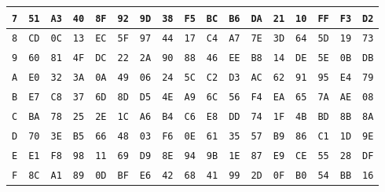 \begin{tabular}{|c|c|c|c|c|c|c|c|c|c|c|c|c|c|c|c|c|}
\cellcolor{gray!30}\texttt{7} & \texttt{51} & \texttt{A3} & \texttt{40} & \texttt{8F} & \texttt{92} & \texttt{9D} & \texttt{38} & \texttt{F5} & \texttt{BC} & \texttt{B6} & \texttt{DA} & \texttt{21} & \texttt{10} & \texttt{FF} & \texttt{F3} & \texttt{D2} \\ \hline
\cellcolor{gray!30}\texttt{8} & \texttt{CD} & \texttt{0C} & \texttt{13} & \texttt{EC} & \texttt{5F} & \texttt{97} & \texttt{44} & \texttt{17} & \texttt{C4} & \texttt{A7} & \texttt{7E} & \texttt{3D} & \texttt{64} & \texttt{5D} & \texttt{19} & \texttt{73} \\ \hline
\cellcolor{gray!30}\texttt{9} & \texttt{60} & \texttt{81} & \texttt{4F} & \texttt{DC} & \texttt{22} & \texttt{2A} & \texttt{90} & \texttt{88} & \texttt{46} & \texttt{EE} & \texttt{B8} & \texttt{14} & \texttt{DE} & \texttt{5E} & \texttt{0B} & \texttt{DB} \\ \hline
\cellcolor{gray!30}\texttt{A} & \texttt{E0} & \texttt{32} & \texttt{3A} & \texttt{0A} & \texttt{49} & \texttt{06} & \texttt{24} & \texttt{5C} & \texttt{C2} & \texttt{D3} & \texttt{AC} & \texttt{62} & \texttt{91} & \texttt{95} & \texttt{E4} & \texttt{79} \\ \hline
\cellcolor{gray!30}\texttt{B} & \texttt{E7} & \texttt{C8} & \texttt{37} & \texttt{6D} & \texttt{8D} & \texttt{D5} & \texttt{4E} & \texttt{A9} & \texttt{6C} & \texttt{56} & \texttt{F4} & \texttt{EA} & \texttt{65} & \texttt{7A} & \texttt{AE} & \texttt{08} \\ \hline
\cellcolor{gray!30}\texttt{C} & \texttt{BA} & \texttt{78} & \texttt{25} & \texttt{2E} & \texttt{1C} & \texttt{A6} & \texttt{B4} & \texttt{C6} & \texttt{E8} & \texttt{DD} & \texttt{74} & \texttt{1F} & \texttt{4B} & \texttt{BD} & \texttt{8B} & \texttt{8A} \\ \hline
\cellcolor{gray!30}\texttt{D} & \texttt{70} & \texttt{3E} & \texttt{B5} & \texttt{66} & \texttt{48} & \texttt{03} & \texttt{F6} & \texttt{0E} & \texttt{61} & \texttt{35} & \texttt{57} & \texttt{B9} & \texttt{86} & \texttt{C1} & \texttt{1D} & \texttt{9E} \\ \hline
\cellcolor{gray!30}\texttt{E} & \texttt{E1} & \texttt{F8} & \texttt{98} & \texttt{11} & \texttt{69} & \texttt{D9} & \texttt{8E} & \texttt{94} & \texttt{9B} & \texttt{1E} & \texttt{87} & \texttt{E9} & \texttt{CE} & \texttt{55} & \texttt{28} & \texttt{DF} \\ \hline
\cellcolor{gray!30}\texttt{F} & \texttt{8C} & \texttt{A1} & \texttt{89} & \texttt{0D} & \texttt{BF} & \texttt{E6} & \texttt{42} & \texttt{68} & \texttt{41} & \texttt{99} & \texttt{2D} & \texttt{0F} & \texttt{B0} & \texttt{54} & \texttt{BB} & \texttt{16} \\ \hline
\end{tabular}
